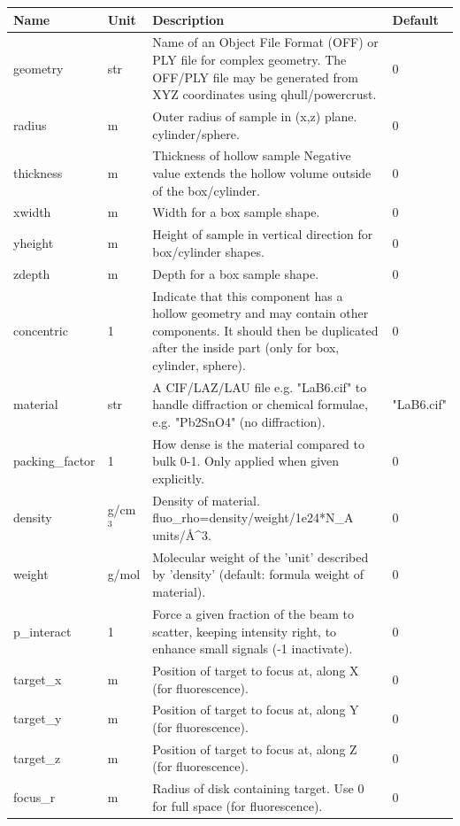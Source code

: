 \begin{longtable}{p{}p{}p{}p{}}
\toprule
\textbf{Name} & \textbf{Unit} & \textbf{Description} & \textbf{Default} \\
\midrule
\endhead
geometry & str & Name of an Object File Format (OFF) or PLY file for complex geometry. The OFF/PLY file may be generated from XYZ coordinates using qhull/powercrust. & 0 \\
radius & m & Outer radius of sample in (x,z) plane. cylinder/sphere. & 0 \\
thickness & m & Thickness of hollow sample Negative value extends the hollow volume outside of the box/cylinder. & 0 \\
xwidth & m & Width for a box sample shape. & 0 \\
yheight & m & Height of sample in vertical direction for box/cylinder shapes. & 0 \\
zdepth & m & Depth for a box sample shape. & 0 \\
concentric & 1 & Indicate that this component has a hollow geometry and may contain other components. It should then be duplicated after the inside part (only for box, cylinder, sphere). & 0 \\
material & str & A CIF/LAZ/LAU file e.g. "LaB6.cif" to handle diffraction or chemical formulae, e.g. "Pb2SnO4" (no diffraction). & "LaB6.cif" \\
packing\_factor & 1 & How dense is the material compared to bulk 0-1. Only applied when given explicitly. & 0 \\
density & g/cm$^{3}$ & Density of material. fluo\_rho=density/weight/1e24*N\_A units/\AA{}\textasciicircum{}3. & 0 \\
weight & g/mol & Molecular weight of the 'unit' described by 'density' (default: formula weight of material). & 0 \\
p\_interact & 1 & Force a given fraction of the beam to scatter, keeping intensity right, to enhance small signals (-1 inactivate). & 0 \\
target\_x & m & Position of target to focus at, along X (for fluorescence). & 0 \\
target\_y & m & Position of target to focus at, along Y (for fluorescence). & 0 \\
target\_z & m & Position of target to focus at, along Z (for fluorescence). & 0 \\
focus\_r & m & Radius of disk containing target. Use 0 for full space (for fluorescence). & 0 \\

\end{longtable}
